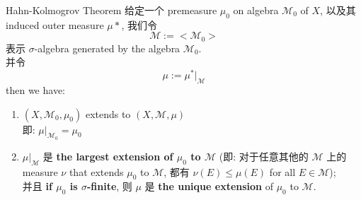 \documentclass[lang=cn,11pt]{elegantbook}
\begin{document}
\begin{theorem}{Hahn-Kolmogrov Theorem}
\label{Hahn-Kolmogrov Theorem}
给定一个 premeasure $\mu_0$ on algebra $\mathcal{M}_0$ of $X$, 以及其 induced outer measure $\mu*$, 我们令 
$$
\mathcal{M} := <\mathcal{M}_0>
$$
表示 $\sigma$-algebra generated by the algebra $\mathcal{M}_0$.\\
并令
$$
\mu := \mu^* |_\mathcal{M}
$$
then we have:
\begin{enumerate}
    \item $(X,\mathcal{M}_0, \mu_0)$ extends to $(X,\mathcal{M},\mu)$\\
    即: $\mu  |_{\mathcal{M}_0} = \mu_0$
    \item $\mu | _\mathcal{M}$ 是 \textbf{the largest extension of $\mu_0$ to $\mathcal{M}$} (即: 对于任意其他的 $\mathcal{M}$ 上的 measure $\nu$ that extends $\mu_0$ to $\mathcal{M}$, 都有 $\nu(E) \leq \mu(E)$ for all $E \in \mathcal{M}$);\\
    并且 \textbf{if $\mu_0$ is $\sigma$-finite}, 则 $\mu$ 是 \textbf{the unique extension} of $\mu_0$ to $\mathcal{M}$.
\end{enumerate}
\end{theorem}
\end{document}
